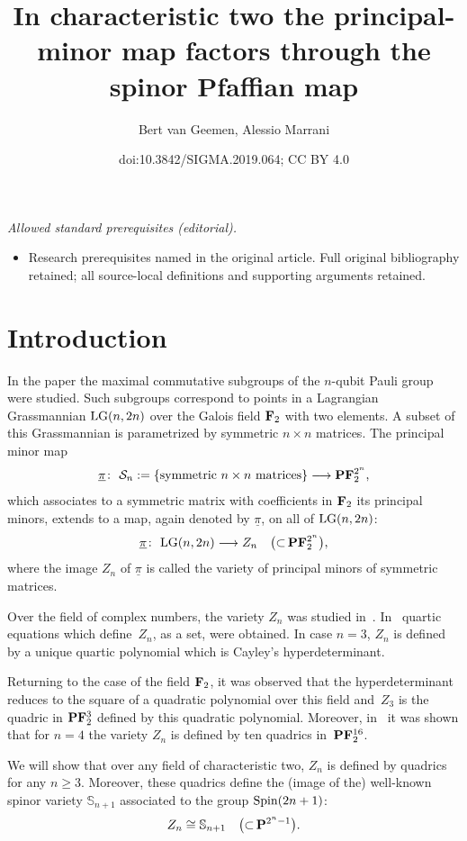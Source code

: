 \documentclass[10pt,a4paper]{amsart}
\title{In characteristic two the principal-minor map factors through the spinor Pfaffian map}
\author{Bert van Geemen, Alessio Marrani}
\date{doi:10.3842/SIGMA.2019.064; CC BY 4.0}
\newcommand{\FF}{{\bf F}}
\newcommand{\PP}{{\bf P}}
\newcommand{\bS}{{\mathbb S}}
\numberwithin{equation}{section}
\providecommand{\cal}{\mathcal}
\begin{document}
\maketitle
\noindent\textit{Allowed standard prerequisites (editorial).}\begin{itemize}
\item Research prerequisites named in the original article. Full original bibliography retained; all source-local definitions and supporting arguments retained.
\end{itemize}\medskip
\section{Introduction}
In the paper \cite{HSL} the maximal commutative subgroups of the $n$-qubit Pauli group were studied. Such subgroups correspond to points in a Lagrangian Grassmannian ${\rm LG}(n,2n)$ over the Galois field $\FF_2$ with two elements. A subset of this Grassmannian is parametrized by symmetric $n\times n$ matrices. The principal minor map
\begin{gather*}
\underline{\pi}\colon \ {\cal S}_n := \{\text{symmetric}\ n\times n \ \text{matrices}\} \longrightarrow \PP\FF_2^{2^n} ,
\end{gather*}
which associates to a symmetric matrix with coefficients in $\FF_2$ its principal minors, extends to a map, again denoted by $\underline{\pi}$, on all of ${\rm LG}(n,2n)$:
\begin{gather*}
\underline{\pi}\colon \ {\rm LG}(n,2n) \longrightarrow Z_n\quad\big({\subset} \, \PP\FF_2^{2^n}\big),
\end{gather*}
where the image $Z_n$ of $\underline{\pi}$ is called the variety of principal minors of symmetric matrices.

Over the field of complex numbers, the variety $Z_n$ was studied in~\cite{HS}. In~\cite{Oeding} quartic equations which define~$Z_n$, as a set, were obtained. In case $n=3$, $Z_n$ is defined by a unique quartic polynomial which is Cayley's hyperdeterminant.

Returning to the case of the field $\FF_2$, it was observed that the hyperdeterminant reduces to the square of a quadratic polynomial over this field and~$Z_3$ is the quadric in $\PP\FF_2^3$ defined by this quadratic polynomial. Moreover, in~\cite{HSL} it was shown that for $n=4$ the variety $Z_n$ is defined by ten quadrics in~$\PP\FF_2^{16}$.

We will show that over any field of characteristic two, $Z_n$ is defined by quadrics for any $n\geq 3$. Moreover, these quadrics define the (image of the) well-known spinor variety $\bS_{n+1}$ associated to the group ${\rm Spin}(2n+1)$:
\begin{gather*}
Z_n \cong \bS_{n+1}\quad \big({\subset} \, \PP^{2^n-1}\big).
\end{gather*}
\end{document}
